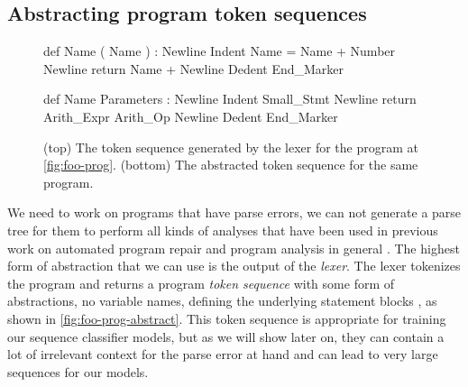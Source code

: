 

\subsection{Abstracting program token sequences}
\label{sec:overview:abstraction}

\begin{figure}[ht]
\begin{ecode}
def Name ( Name ) : Newline
Indent Name = Name + Number Newline
return Name + Newline
Dedent End_Marker
\end{ecode}

\begin{ecode}
def Name Parameters : Newline
Indent Small_Stmt Newline
return Arith_Expr Arith_Op Newline
Dedent End_Marker
\end{ecode}
\caption{(top) The token sequence generated by the lexer for the program at
\autoref{fig:foo-prog}. (bottom) The abstracted token sequence for the same
program.}
\label{fig:foo-prog-abstract}
\end{figure}

We need to work on programs that have parse errors, \ie we can not generate a
parse tree for them to perform all kinds of analyses that have been used in
previous work on automated program repair \citep{?} and program analysis in
general \citep{?}.
%
The highest form of abstraction that we can use is the output of the
\emph{lexer}. The lexer tokenizes the program and returns a program \emph{token
sequence} with some form of abstractions, \eg no variable names, defining the
underlying statement blocks \etc, as shown in \autoref{fig:foo-prog-abstract}.
This token sequence is appropriate for training our sequence classifier models,
but as we will show later on, they can contain a lot of irrelevant context for
the parse error at hand and can lead to very large sequences for our models.

